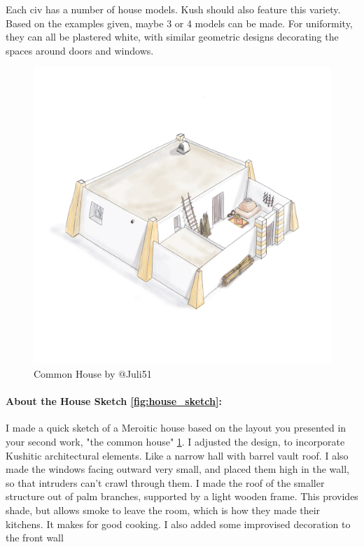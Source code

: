 \documentclass[a4paper,12pt]{scrreprt}
\begin{document}
Each civ has a number of house models. Kush should also feature this variety. Based on the examples given, maybe 3 or 4 models can be made. For uniformity, they can all be plastered white, with similar geometric designs decorating the spaces around doors and windows. 

\begin{figure}[H]
	\centering
	\includegraphics[width=\textwidth]{img/house/juli51_common_house}
	\caption{Common House by @Juli51}\label{fig:common_house}
\end{figure}

\paragraph{About the House Sketch \ref{fig:house_sketch}:} I made a quick sketch of a Meroitic house based on the layout you presented in your second work, "the common house" \ref{fig:common_house}. I adjusted the design, to incorporate Kushitic architectural elements. Like a narrow hall with barrel vault roof. I also made the windows facing outward very small, and placed them high in the wall, so that intruders can't crawl through them. I made the roof of the smaller structure out of palm branches, supported by a light wooden frame. This provides shade, but allows smoke to leave the room, which is how they made their kitchens. It makes for good cooking. I also added some improvised decoration to the front wall 
\end{document}
